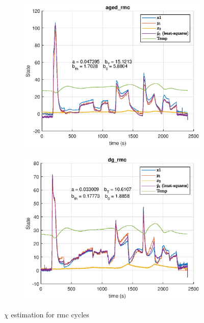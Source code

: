 \begin{figure}[H]
    \begin{minipage}{0.49\textwidth}
        \begin{figure}[H]
            \includegraphics[width=\textwidth]{./figs/chi_est/aged_rmc_chiT.eps}
        \end{figure}
    \end{minipage}
    \begin{minipage}{0.49\textwidth}
        \begin{figure}[H]
            \includegraphics[width=\textwidth]{./figs/chi_est/dg_rmc_chiT.eps}
        \end{figure}
    \end{minipage}
        \caption{$\chi$ estimation for rmc cycles}
\end{figure}

